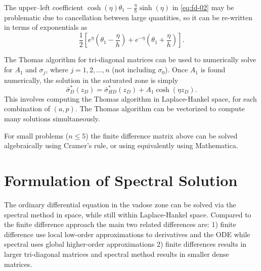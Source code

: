 \documentclass[12pt,letterpaper]{article}
\begin{document}
The upper--left coefficient $\cosh(\eta)\theta_1 - \frac{\eta}{h}\sinh(\eta)$ in
\eqref{eq:fd-02} may be problematic due to cancellation between large
quantities, so it can be re-written in terms of exponentials as 
\begin{equation}
 \nonumber
 \frac{1}{2} \left[ e^{\eta} \left( \theta_1 - \frac{\eta}{h}\right) + e^{-\eta}
   \left( \theta_1 + \frac{\eta}{h}\right) \right].
\end{equation}

The Thomas algorithm for tri-diagonal matrices can be used to
numerically solve for $A_1$ and $\sigma_j$, where $j=1,2, \dots, n$
(not including $\sigma_0$).  Once $A_1$ is found numerically, the
solution in the saturated zone is simply 
\begin{equation}
 \nonumber
 \bar{\sigma}^{\ast}_{D}(z_D) = \bar{\sigma}^{\ast}_{HD}(z_D) + A_1
 \cosh(\eta z_D).
\end{equation}
This involves computing the Thomas algorithm in Laplace-Hankel space,
for each combination of $(a,p)$.  The Thomas algorithm can be
vectorized to compute many solutions simultaneously.

For small problems ($n \le 5$) the finite difference matrix above can
be solved algebraically using Cramer's rule, or using equivalently
using Mathematica.  

\section{Formulation of Spectral Solution}
The ordinary differential equation in the vadose zone can be solved
via the spectral method in space, while still within Laplace-Hankel
space.  Compared to the finite difference approach the main
two related differences are: 1) finite difference use local low-order
approximations to derivatives and the ODE while spectral uses global
higher-order approximations 2) finite differences results in
larger tri-diagonal matrices and spectral method results in smaller
dense matrices.
\end{document}
